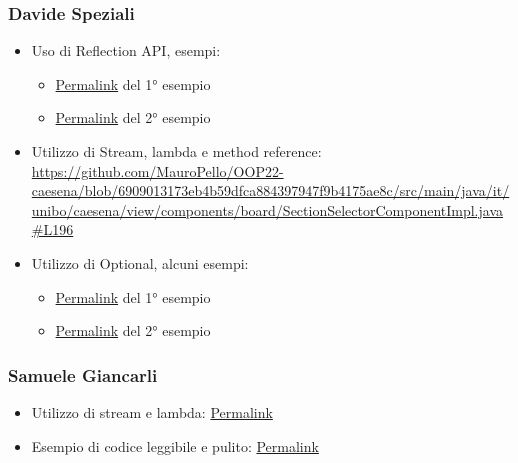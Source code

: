 \subsubsection*{Davide Speziali}
\begin{itemize}
    \item Uso di Reflection API, esempi:
    \begin{itemize}
        \item \href{https://github.com/MauroPello/OOP22-caesena/blob/6909013173eb4b59dfca884397947f9b4175ae8c/src/main/java/it/unibo/caesena/utils/StringUtil.java#L168}{Permalink} del 1° esempio
        \item \href{https://github.com/MauroPello/OOP22-caesena/blob/6909013173eb4b59dfca884397947f9b4175ae8c/src/main/java/it/unibo/caesena/model/tile/TileType.java#L144}{Permalink} del 2° esempio
    \end{itemize}
    \item Utilizzo di Stream, lambda e method reference: \url{https://github.com/MauroPello/OOP22-caesena/blob/6909013173eb4b59dfca884397947f9b4175ae8c/src/main/java/it/unibo/caesena/view/components/board/SectionSelectorComponentImpl.java#L196}
    \item Utilizzo di Optional, alcuni esempi:
    \begin{itemize}
        \item \href{https://github.com/MauroPello/OOP22-caesena/blob/6909013173eb4b59dfca884397947f9b4175ae8c/src/main/java/it/unibo/caesena/view/components/tile/TileImage.java#L25}{Permalink} del 1° esempio
        \item \href{https://github.com/MauroPello/OOP22-caesena/blob/6909013173eb4b59dfca884397947f9b4175ae8c/src/main/java/it/unibo/caesena/view/components/board/BoardComponentImpl.java#L300}{Permalink} del 2° esempio
    \end{itemize}
\end{itemize}

\subsubsection*{Samuele Giancarli}
\begin{itemize}
    \item Utilizzo di stream e lambda: \href{https://github.com/MauroPello/OOP22-caesena/blob/main/src/main/java/it/unibo/caesena/view/components/meeple/RemainingMeeplesComponentImpl.java#L64}{Permalink}
    \item Esempio di codice leggibile e pulito: \href{https://github.com/MauroPello/OOP22-caesena/blob/e35a57ad5bd0b2fce619acdc5060cb8dc1d2d1e9/src/main/java/it/unibo/caesena/model/GameSetTileMediatorImpl.java#L123}{Permalink}
\end{itemize}
